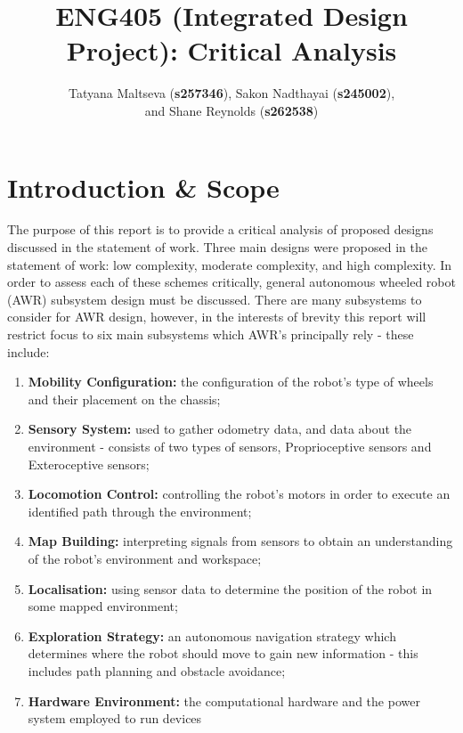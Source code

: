 \documentclass[a4paper]{article}
\begin{document}
\title{ENG405 (Integrated Design Project): Critical Analysis}
\author{Tatyana Maltseva (\textbf{s257346}), Sakon Nadthayai (\textbf{s245002}),\\ and Shane Reynolds (\textbf{s262538})}

\null  %
\nointerlineskip  %
\vfill
\let\snewpage \newpage
\let\newpage \relax
\maketitle
\let \newpage \snewpage
\vfill 
\newpage


\tableofcontents

\newpage

\section{Introduction \& Scope}
The purpose of this report is to provide a critical analysis of proposed designs discussed in the statement of work. Three main designs were proposed in the statement of work: low complexity, moderate complexity, and high complexity. In order to assess each of these schemes critically, general autonomous wheeled robot (AWR) subsystem design must be discussed. There are many subsystems to consider for AWR design, however, in the interests of brevity this report will restrict focus to six main subsystems which AWR's principally rely - these include:
\begin{enumerate}
\item \textbf{Mobility Configuration:} the configuration of the robot's type of wheels and their placement on the chassis;
\item \textbf{Sensory System:} used to gather odometry data, and data about the environment - consists of two types of sensors, Proprioceptive sensors and Exteroceptive sensors;
\item \textbf{Locomotion Control:} controlling the robot's motors in order to execute an identified path through the environment;
\item \textbf{Map Building:} interpreting signals from sensors to obtain an understanding of the robot's environment and workspace;
\item \textbf{Localisation:} using sensor data to determine the position of the robot in some mapped environment;
\item \textbf{Exploration Strategy:} an autonomous navigation strategy which determines where the robot should move to gain new information - this includes path planning and obstacle avoidance;
\item \textbf{Hardware Environment:} the computational hardware and the power system employed to run devices
\end{enumerate}
\end{document}
